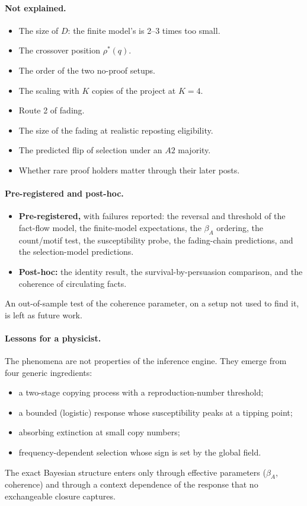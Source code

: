 \documentclass[10pt,a4paper]{article}
\theoremstyle{definition}
\begin{document}
\paragraph{Not explained.}
\begin{itemize}
\item The size of $D$: the finite model's is 2--3 times too small.
\item The crossover position $\rho^*(q)$.
\item The order of the two no-proof setups.
\item The scaling with $K$ copies of the project at $K=4$.
\item Route 2 of fading.
\item The size of the fading at realistic reposting eligibility.
\item The predicted flip of selection under an $A2$ majority.
\item Whether rare proof holders matter through their later posts.
\end{itemize}

\paragraph{Pre-registered and post-hoc.}
\begin{itemize}
\item \textbf{Pre-registered,} with failures reported: the reversal and threshold of the fact-flow model, the finite-model
  expectations, the $\beta_A$ ordering, the count/motif test, the susceptibility probe, the fading-chain predictions,
  and the selection-model predictions.
\item \textbf{Post-hoc:} the identity result, the survival-by-persuasion comparison, and the coherence of circulating
  facts.
\end{itemize}
An out-of-sample test of the coherence parameter, on a setup not used to find it, is left as future work.

\paragraph{Lessons for a physicist.} The phenomena are not properties of the inference engine. They emerge from four
generic ingredients:
\begin{itemize}
\item a two-stage copying process with a reproduction-number threshold;
\item a bounded (logistic) response whose susceptibility peaks at a tipping point;
\item absorbing extinction at small copy numbers;
\item frequency-dependent selection whose sign is set by the global field.
\end{itemize}
The exact Bayesian structure enters only through effective parameters ($\beta_A$, coherence) and through a context
dependence of the response that no exchangeable closure captures.
\end{document}
